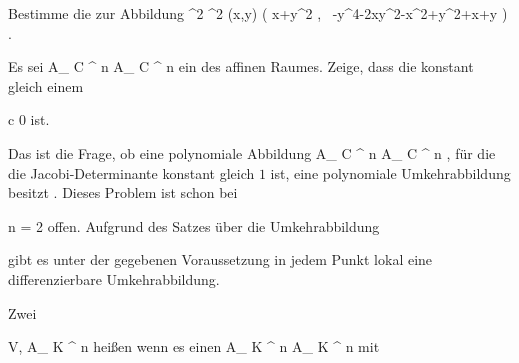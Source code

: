 {}
{





Bestimme die
zur Abbildung
\maabbeledisp {} { \R^2 } { \R^2
} { (x,y) } { \left(  x+y^2   , \,   -y^4-2xy^2-x^2+y^2+x+y                   \right)
} {.}





}
{} {}

{}
{





Es sei
\maabbdisp {\varphi} { { {\mathbb A}_{  {\mathbb C}  }^{  n   } } } { { {\mathbb A}_{  {\mathbb C}  }^{  n   } }
} {}
ein
des affinen Raumes. Zeige, dass die
konstant gleich einem

\mavergleichskette
{\vergleichskette
{c
}
{ \neq }{ 0
}
{  }{
}
{    }{
}
{   }{
}
}
{}{}{}
ist.





}
{} {}

Das  {} ist die Frage, ob eine polynomiale Abbildung
\maabbdisp {\varphi} { { {\mathbb A}_{  {\mathbb C}  }^{ n  } } } { { {\mathbb A}_{  {\mathbb C}  }^{ n  } }
} {,}
für die die Jacobi-Determinante konstant gleich $1$ ist, eine polynomiale Umkehrabbildung besitzt
 {} {.}
Dieses Problem ist schon bei

\mavergleichskette
{\vergleichskette
{ n
}
{ = }{ 2
}
{  }{
}
{    }{
}
{   }{
}
}
{}{}{}
offen. Aufgrund
des
Satzes über die Umkehrabbildung

gibt es unter der gegebenen Voraussetzung in jedem Punkt lokal eine differenzierbare Umkehrabbildung.







Zwei

\mavergleichskette
{\vergleichskette
{ V, 
}
{ \subseteq }{ { {\mathbb A}_{  K }^{  n   } }
}
{  }{
}
{    }{
}
{   }{
}
}
{}{}{}
heißen  wenn es einen
\maabb {\varphi} { { {\mathbb A}_{  K }^{  n   } }  } { { {\mathbb A}_{  K }^{  n   } }
} {}
mit

